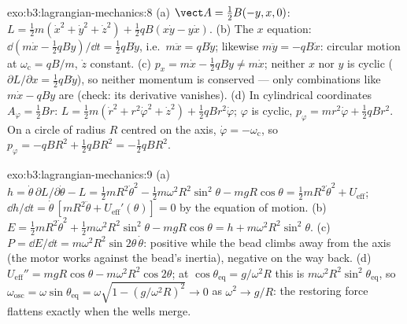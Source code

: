 \begin{solution}{exo:b3:lagrangian-mechanics:8}
(a) $\vect A = \tfrac12 B(-y, x, 0)$:
$L = \tfrac12 m(\dot x^2 + \dot y^2 + \dot z^2) + \tfrac12 qB(x\dot y -
y\dot x)$. (b) The $x$ equation: $\dd(m\dot x - \tfrac12 qBy)/\dd t =
\tfrac12 qB\dot y$, i.e.\ $m\ddot x = qB\dot y$; likewise $m\ddot y =
-qB\dot x$: circular motion at $\omega_{\text{c}} = qB/m$, $\dot z$
constant. (c) $p_x = m\dot x - \tfrac12 qBy \neq m\dot x$; neither $x$
nor $y$ is cyclic ($\partial L/\partial x = \tfrac12 qB\dot y$), so
neither momentum is conserved --- only combinations like $m\dot x -
qBy$ are (check: its derivative vanishes). (d) In cylindrical
coordinates $A_\varphi = \tfrac12 Br$:
$L = \tfrac12 m(\dot r^2 + r^2\dot\varphi^2 + \dot z^2) + \tfrac12
qBr^2\dot\varphi$; $\varphi$ is cyclic, $p_\varphi = mr^2\dot\varphi +
\tfrac12 qBr^2$. On a circle of radius $R$ centred on the axis,
$\dot\varphi = -\omega_{\text{c}}$, so $p_\varphi = -qBR^2 + \tfrac12
qBR^2 = -\tfrac12 qBR^2$.
\end{solution}

\begin{solution}{exo:b3:lagrangian-mechanics:9}
(a) $h = \dot\theta\,\partial L/\partial\dot\theta - L = \tfrac12
mR^2\dot\theta^2 - \tfrac12 m\omega^2R^2\sin^2\theta - mgR\cos\theta =
\tfrac12 mR^2\dot\theta^2 + U_{\text{eff}}$; $\dd h/\dd t =
\dot\theta\,[mR^2\ddot\theta + U_{\text{eff}}'(\theta)] = 0$ by the
equation of motion. (b) $E = \tfrac12 mR^2\dot\theta^2 + \tfrac12
m\omega^2R^2\sin^2\theta - mgR\cos\theta = h +
m\omega^2R^2\sin^2\theta$. (c) $P = \dd E/\dd t =
m\omega^2R^2\sin2\theta\,\dot\theta$: positive while the bead climbs
away from the axis (the motor works against the bead's inertia),
negative on the way back. (d) $U_{\text{eff}}'' = mgR\cos\theta -
m\omega^2R^2\cos2\theta$; at $\cos\theta_{\text{eq}} = g/\omega^2R$
this is $m\omega^2R^2\sin^2\theta_{\text{eq}}$, so
$\omega_{\text{osc}} = \omega\sin\theta_{\text{eq}} = \omega\sqrt{1 -
(g/\omega^2R)^2} \to 0$ as $\omega^2 \to g/R$: the restoring force
flattens exactly when the wells merge.
\end{solution}

